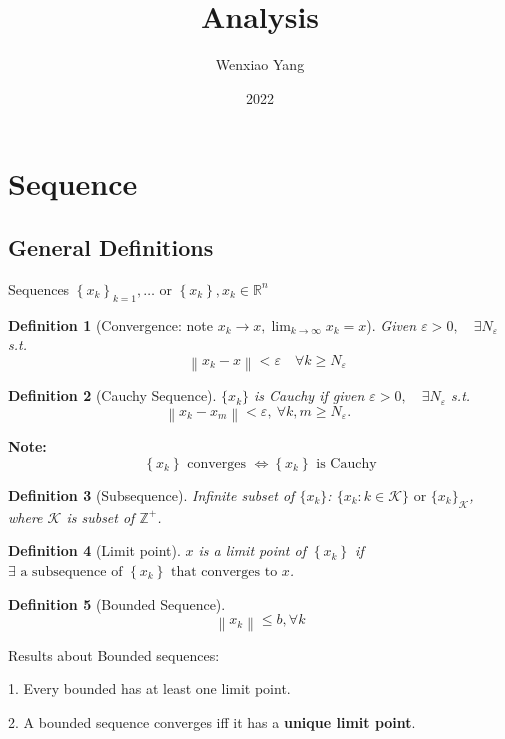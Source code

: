 \documentclass[11pt,a4paper]{article}
\title{Analysis}
\author[*]{Wenxiao Yang}
\affil[*]{Department of Mathematics, University of Illinois at Urbana-Champaign}
\date{2022}
\newtheorem{definition}{Definition}
\begin{document}
\maketitle
\tableofcontents
\newpage

\section{Sequence}
\subsection{General Definitions}
Sequences $\left\{x_{k}\right\}_{k=1}, \ldots$ or $\left\{x_{k}\right\}, x_{k} \in \mathbb{R}^{n}$
\begin{definition}[Convergence: note $x_{k} \rightarrow x, \lim _{k \rightarrow \infty} x_{k}=x$]
    Given $\varepsilon>0, \quad \exists N_{\varepsilon}$ s.t. $$\quad\left\|x_{k}-x\right\|<\varepsilon \quad \forall k \geqslant N_{\varepsilon}$$
\end{definition}

\begin{definition}[Cauchy Sequence]
    $\{x_k\}$ is Cauchy if given $\varepsilon>0, \quad \exists N_{\varepsilon}$ s.t.
    $$\left\|x_{k}-x_{m}\right\|<\varepsilon,\  \forall k, m \geqslant N_{\varepsilon} \text {. }$$
\end{definition}
\textbf{Note:}$$\left\{x_{k}\right\} \text { converges } \Longleftrightarrow\left\{x_{k}\right\} \text { is Cauchy}$$


\begin{definition}[Subsequence]
Infinite subset of $\{x_k\}$: $\{x_k:k\in \mathcal{K} \}\text{ or } \{x_k\}_\mathcal{K} $, where $\mathcal{K} $ is subset of $\mathbb{Z}^+$.
\end{definition}

\begin{definition}[Limit point]
$x$ is a limit point of $\left\{x_{k}\right\}$ if $\exists \text { a subsequence of }\left\{x_{k}\right\} \text { that converges to } x$.
\end{definition}

\begin{definition}[Bounded Sequence]
    $$\left\|x_{k}\right\| \leqslant b, \forall k$$
\end{definition}

Results about Bounded sequences:

1. Every bounded has at least one limit point.

2. A bounded sequence converges iff it has a \textbf{unique limit point}.
\end{document}
